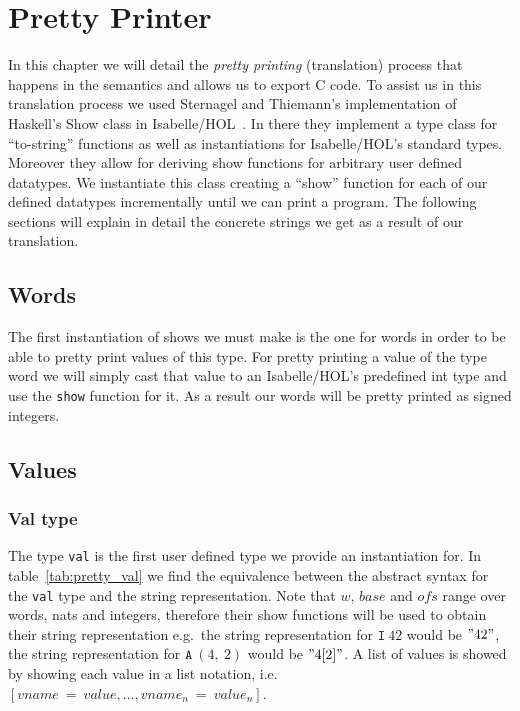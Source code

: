 \chapter{Pretty Printer}\label{chapter:pretty}

In this chapter we will detail the \textit{pretty printing} (translation) process that happens in the semantics and allows us to export C code.
To assist us in this translation process we used Sternagel and Thiemann's implementation of Haskell's Show class in Isabelle/HOL~\parencite{Show-AFP}.
In there they implement a type class for ``to-string'' functions as well as instantiations for Isabelle/HOL's standard types.
Moreover they allow for deriving show functions for arbitrary user defined datatypes.
We instantiate this class creating a ``show'' function for each of our defined datatypes incrementally until we can print a program.
The following sections will explain in detail the concrete strings we get as a result of our translation.

\section{Words}\label{section:pretty_words}
The first instantiation of shows we must make is the one for words in order to be able to pretty print values of this type.
For pretty printing a value of the type word we will simply cast that value to an Isabelle/HOL's predefined int type and use the \verb|show| function for it.
As a result our words will be pretty printed as signed integers.

\section{Values}\label{section:pretty_values}

\subsection{Val type}\label{subsection:pretty_val_type}
The type \verb|val| is the first user defined type we provide an instantiation for.
In table~\ref{tab:pretty_val} we find the equivalence between the abstract syntax for the \verb|val| type and the string representation.
Note that $w$, $base$ and $ofs$ range over words, nats and integers, therefore their show functions will be used to obtain their string representation e.g.\ the string representation for $\mathtt{I}\ 42$ would be $"42"$, the string representation for $\mathtt{A}\ (4,\ 2)$ would be $"4[2]"$.
A list of values is showed by showing each value in a list notation, i.e.\ $[vname\ =\ value, \dots, vname_n\ =\ value_n]$.


